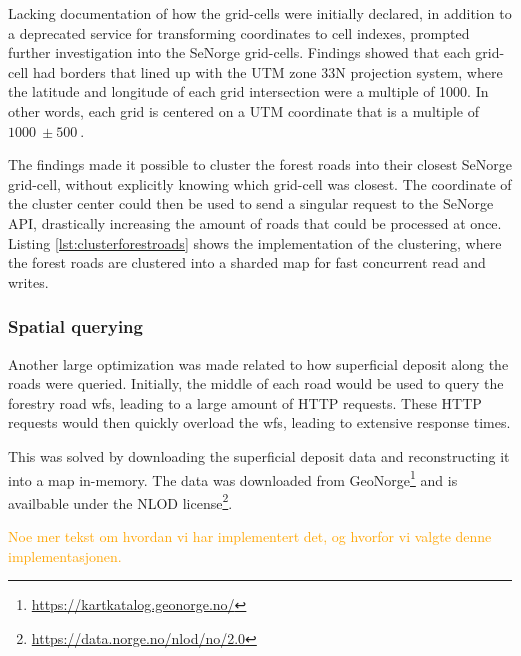 Lacking documentation of how the grid-cells were initially declared, in addition to a deprecated service for transforming coordinates to cell indexes, prompted further investigation into the SeNorge grid-cells. Findings showed that each grid-cell had borders that lined up with the UTM zone 33N projection system, where the latitude and longitude of each grid intersection were a multiple of \qty{1000}{}. In other words, each grid is centered on a UTM coordinate that is a multiple of $\qty{1000}{}\pm\qty{500}{}$.

The findings made it possible to cluster the forest roads into their closest SeNorge grid-cell, without explicitly knowing which grid-cell was closest. The coordinate of the cluster center could then be used to send a singular request to the SeNorge API, drastically increasing the amount of roads that could be processed at once. Listing \ref{lst:clusterforestroads} shows the implementation of the clustering, where the forest roads are clustered into a sharded map for fast concurrent read and writes.

\begin{figure}[H]

\end{figure}

\subsubsection{Spatial querying}

Another large optimization was made related to how superficial deposit along the roads were queried. Initially, the middle of each road would be used to query the forestry road \Gls{wfs}, leading to a large amount of HTTP requests. These HTTP requests would then quickly overload the \Gls{wfs}, leading to extensive response times.

This was solved by downloading the superficial deposit data and reconstructing it into a map in-memory. The data was downloaded from GeoNorge\footnote{\url{https://kartkatalog.geonorge.no/}} and is availbable under the NLOD license\footnote{\url{https://data.norge.no/nlod/no/2.0}}. 

\textcolor{orange}{Noe mer tekst om hvordan vi har implementert det, og hvorfor vi valgte denne implementasjonen.}

\begin{figure}[h]

\end{figure}


